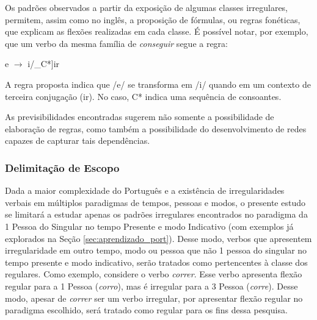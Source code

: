 Os padrões observados a partir da exposição de algumas classes irregulares, permitem, assim como no inglês, a proposição de fórmulas, ou regras fonéticas, que explicam as flexões realizadas em cada classe. É possível notar, por exemplo, que um verbo da mesma família de \textit{conseguir} segue a regra:

\begin{center}
e $\rightarrow$ i/\_C*]ir 
\end{center}

A regra proposta indica que /e/ se transforma em /i/ quando em um contexto de terceira conjugação (ir). No caso, C* indica uma sequência de consoantes. 

As previsibilidades encontradas sugerem não somente a possibilidade de elaboração de regras, como também a possibilidade do desenvolvimento de redes capazes de capturar tais dependências. 

\subsubsection{Delimitação de Escopo}
\label{sec:escopo}

Dada a maior complexidade do Português e a existência de irregularidades verbais em múltiplos paradigmas de tempos, pessoas e modos, o presente estudo se limitará a estudar apenas os padrões irregulares encontrados no paradigma da 1 Pessoa do Singular no tempo Presente e modo Indicativo (com exemplos já explorados na Seção \ref{sec:aprendizado_port}). Desse modo, verbos que apresentem irregularidade em outro tempo, modo ou pessoa que não 1 pessoa do singular no tempo presente e modo indicativo, serão tratados como pertencentes à classe dos regulares. Como exemplo, considere o verbo \textit{correr}. Esse verbo apresenta flexão regular para a 1 Pessoa (\textit{corro}), mas é irregular para a 3 Pessoa (\textit{corre}). Desse modo, apesar de \textit{correr} ser um verbo irregular, por apresentar flexão regular no paradigma escolhido, será tratado como regular para os fins dessa pesquisa.


 



